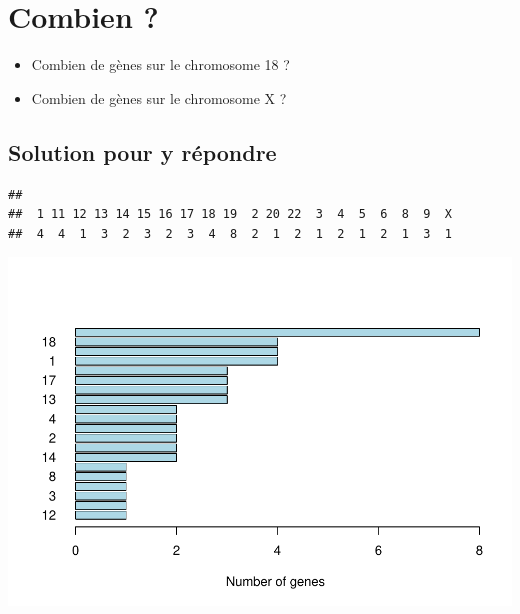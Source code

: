 \documentclass[
]{book}
\newenvironment{Shaded}{\begin{snugshade}}{\end{snugshade}}
\newcommand{\AttributeTok}[1]{\textcolor[rgb]{0.77,0.63,0.00}{#1}}
\newcommand{\ConstantTok}[1]{\textcolor[rgb]{0.00,0.00,0.00}{#1}}
\newcommand{\DecValTok}[1]{\textcolor[rgb]{0.00,0.00,0.81}{#1}}
\newcommand{\FunctionTok}[1]{\textcolor[rgb]{0.00,0.00,0.00}{#1}}
\newcommand{\NormalTok}[1]{#1}
\newcommand{\SpecialCharTok}[1]{\textcolor[rgb]{0.00,0.00,0.00}{#1}}
\newcommand{\StringTok}[1]{\textcolor[rgb]{0.31,0.60,0.02}{#1}}
\providecommand{\tightlist}{%
  \setlength{\itemsep}{0pt}\setlength{\parskip}{0pt}}
\begin{document}
\hypertarget{combien}{%
\section{Combien ?}\label{combien}}

\begin{itemize}
\tightlist
\item
  Combien de gènes sur le chromosome 18 ?
\item
  Combien de gènes sur le chromosome X ?
\end{itemize}

\hypertarget{solution-pour-y-ruxe9pondre}{%
\subsection{Solution pour y répondre}\label{solution-pour-y-ruxe9pondre}}

\begin{Shaded}
\end{Shaded}

\begin{verbatim}
## 
##  1 11 12 13 14 15 16 17 18 19  2 20 22  3  4  5  6  8  9  X 
##  4  4  1  3  2  3  2  3  4  8  2  1  2  1  2  1  2  1  3  1
\end{verbatim}

\begin{Shaded}
\end{Shaded}

\includegraphics{images/unnamed-chunk-107-1.pdf}
\end{document}

